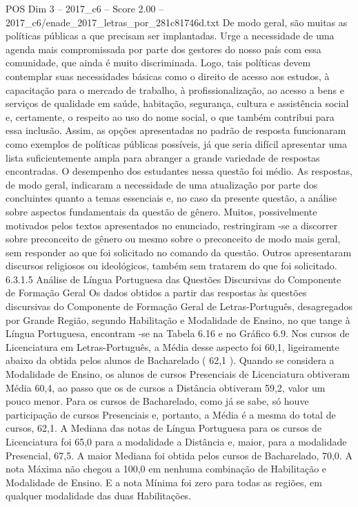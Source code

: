 \begin{textsample}{POS Dim 3 – 2017\_c6 – Score 2.00 – 2017\_c6/enade\_2017\_letras\_por\_281c81746d.txt}
De modo geral, são muitas as políticas públicas a que precisam ser implantadas.
Urge a necessidade de uma agenda mais compromissada por parte dos gestores do nosso país com essa comunidade, que ainda é muito discriminada.
Logo, tais políticas devem contemplar suas necessidades básicas como o direito de acesso aos estudos, à capacitação para o mercado de trabalho, à profissionalização, ao acesso a bens e serviços de qualidade em saúde, habitação, segurança, cultura e assistência social e, certamente, o respeito ao uso do nome social, o que também contribui para essa inclusão.
Assim, as opções apresentadas no padrão de resposta funcionaram como exemplos de políticas públicas possíveis, já que seria difícil apresentar uma lista suficientemente ampla para abranger a grande variedade de respostas encontradas.
O desempenho dos estudantes nessa questão foi médio.
As respostas, de modo geral, indicaram a necessidade de uma atualização por parte dos concluintes quanto a temas essenciais e, no caso da presente questão, a análise sobre aspectos fundamentais da questão de gênero.
Muitos, possivelmente motivados pelos textos apresentados no enunciado, restringiram -se a discorrer sobre preconceito de gênero ou mesmo sobre o preconceito de modo mais geral, sem responder ao que foi solicitado no comando da questão.
Outros apresentaram discursos religiosos ou ideológicos, também sem tratarem do que foi solicitado. 6.3.1.5 Análise de Língua Portuguesa das Questões Discursivas do Componente de Formação Geral Os dados obtidos a partir das respostas às questões discursivas do Componente de Formação Geral de Letras-Português, desagregados por Grande Região, segundo Habilitação e Modalidade de Ensino, no que tange à Língua Portuguesa, encontram -se na Tabela 6.16 e no Gráfico 6.9.
Nos cursos de Licenciatura em Letras-Português, a Média desse aspecto foi 60,1, ligeiramente abaixo da obtida pelos alunos de Bacharelado ( 62,1 ).
Quando se considera a Modalidade de Ensino, os alunos de cursos Presenciais de Licenciatura obtiveram Média 60,4, ao passo que os de cursos a Distância obtiveram 59,2, valor um pouco menor.
Para os cursos de Bacharelado, como já se sabe, só houve participação de cursos Presenciais e, portanto, a Média é a mesma do total de cursos, 62,1.
A Mediana das notas de Língua Portuguesa para os cursos de Licenciatura foi 65,0 para a modalidade a Distância e, maior, para a modalidade Presencial, 67,5.
A maior Mediana foi obtida pelos cursos de Bacharelado, 70,0.
A nota Máxima não chegou a 100,0 em nenhuma combinação de Habilitação e Modalidade de Ensino.
E a nota Mínima foi zero para todas as regiões, em qualquer modalidade das duas Habilitações.

\end{textsample}
